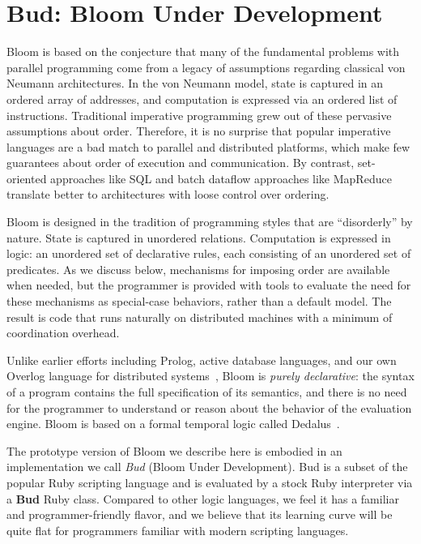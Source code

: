 \section{Bud: Bloom Under Development}
\label{sec:lang}
Bloom is based on the conjecture that many of the fundamental problems with
parallel programming come from a legacy of assumptions regarding classical von
Neumann architectures.  In the von Neumann model, state is captured in an
ordered array of addresses, and computation is expressed via an ordered list of
instructions.  Traditional imperative programming grew out of these pervasive
assumptions about order.  Therefore, it is no surprise that popular imperative
languages are a bad match to parallel and distributed platforms, which make few
guarantees about order of execution and communication. By contrast, set-oriented
approaches like SQL and batch dataflow approaches like MapReduce translate
better to architectures with loose control over ordering.

Bloom is designed in the tradition of programming styles that are ``disorderly'' by nature.  State is captured in unordered relations.  Computation is expressed in logic: an unordered set of declarative rules, each consisting of an unordered set of predicates.  As we discuss below, mechanisms for imposing order are available when needed, but the programmer is provided with tools to evaluate the need for these mechanisms as special-case behaviors, rather than a default model.   The result is code that runs naturally on distributed machines with a minimum of coordination overhead.
 
Unlike earlier efforts\kc{,} including Prolog, active database languages,
and our own Overlog language for distributed systems~\cite{p2}, Bloom is {\em purely declarative}: the syntax of a program contains the full specification of its semantics, and there is no need for the programmer to understand or reason about the behavior of the evaluation engine.  Bloom is based on a formal temporal logic called Dedalus~\cite{dedalus-techr}.

The prototype version of Bloom we describe here is embodied in an implementation we call {\em Bud} (Bloom Under Development).  Bud is a subset of the popular Ruby scripting language and is evaluated by a stock Ruby interpreter via a \textbf{Bud} Ruby class.  Compared to other logic languages, we feel it has a familiar and programmer-friendly flavor, and we believe that its learning curve will be quite flat for programmers familiar with modern scripting languages.

